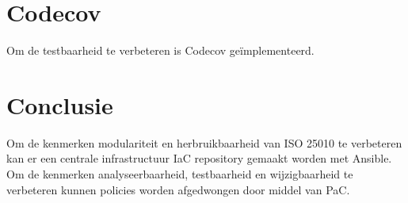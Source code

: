 \section{Codecov}
Om de testbaarheid te verbeteren is Codecov geïmplementeerd.

\section{Conclusie}
Om de kenmerken modulariteit en herbruikbaarheid van ISO 25010 te verbeteren kan er een centrale infrastructuur IaC repository gemaakt worden met Ansible. Om de kenmerken analyseerbaarheid, testbaarheid en wijzigbaarheid te verbeteren kunnen policies worden afgedwongen door middel van PaC.
